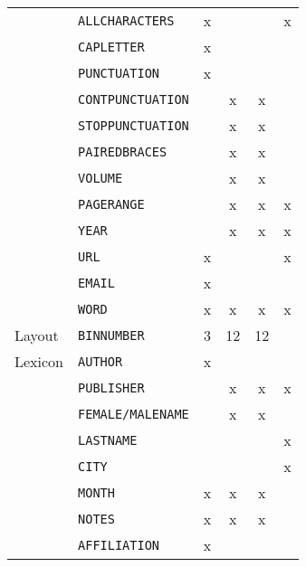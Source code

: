 {\begin{minipage}[c]{\linewidth}
\begin{tabular}{l l c c c c}
          & \texttt{ALLCHARACTERS}        & x       &             &          & x     \\
          & \texttt{CAPLETTER}            & x       &             &          &       \\
          & \texttt{PUNCTUATION}          & x       &             &          &       \\
          & \texttt{CONTPUNCTUATION}      &         & x           & x        &       \\
          & \texttt{STOPPUNCTUATION}      &         & x           & x        &       \\
          & \texttt{PAIREDBRACES}         &         & x           & x        &       \\
          & \texttt{VOLUME}               &         & x           & x        &       \\
          & \texttt{PAGERANGE}            &         & x           & x        &  x    \\
          & \texttt{YEAR}                 &         & x           & x        &  x    \\
          & \texttt{URL}                  & x       &             &          &  x    \\
          & \texttt{EMAIL}                & x       &             &          &       \\
          & \texttt{WORD}                 & x       & x           & x        &  x    \\
  \midrule
  Layout  & \texttt{BINNUMBER}            & 3       & 12          & 12       &       \\
  \midrule
  Lexicon & \texttt{AUTHOR}               & x       &             &          &       \\
          & \texttt{PUBLISHER}            &         & x           & x        & x     \\
          & \texttt{FEMALE/MALENAME}      &         & x           & x        &       \\
          & \texttt{LASTNAME}             &         &             &          & x     \\
          & \texttt{CITY}                 &         &             &          & x     \\
          & \texttt{MONTH}                & x       & x           & x        &       \\
          & \texttt{NOTES}                & x       & x           & x        &       \\
          & \texttt{AFFILIATION}          & x       &             &          &       \\
  \bottomrule
\end{tabular}
\label{tab:feature-survey}
\end{minipage}
}

